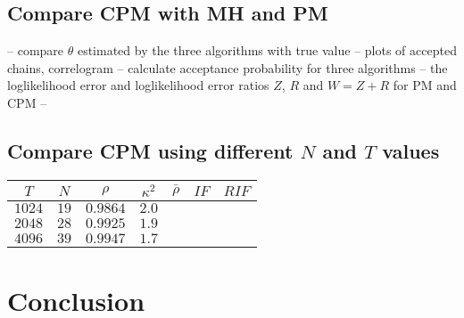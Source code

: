 \documentclass{article}
\begin{document}
\subsection{Compare CPM with MH and PM}


-- compare $\theta$ estimated by the three algorithms with true value
-- plots of accepted chains, correlogram
-- calculate acceptance probability for three algorithms
-- the loglikelihood error and loglikelihood error ratios $Z$, $R$ and $W=Z+R$ for PM and CPM
--


\subsection{Compare CPM using different $N$ and $T$ values}


\begin{table}[h]
\begin{center}
\begin{tabular}{ccccccc}
\hline \hline
$T$    & $N$  & $\rho$   & $\kappa^2$ & $\bar{\rho}$ & $IF$ & $RIF$ \\ \hline
$1024$ & $19$ & $0.9864$ & $2.0$      &              &      &       \\ \hline
$2048$ & $28$ & $0.9925$ & $1.9$      &              &      &       \\ \hline
$4096$ & $39$ & $0.9947$ & $1.7$      &              &      &       \\ \hline \hline
\end{tabular}
\end{center}
\end{table}




  \section{Conclusion}
\end{document}
